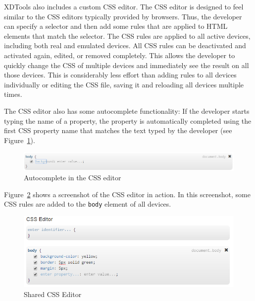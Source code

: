 XDTools also includes a custom CSS editor. The CSS editor is designed to feel similar to the CSS editors typically provided by browsers. Thus, the developer can specify a selector and then add some rules that are applied to HTML elements that match the selector. The CSS rules are applied to all active devices, including both real and emulated devices. All CSS rules can be deactivated and activated again, edited, or removed completely. This allows the developer to quickly change the CSS of multiple devices and immediately see the result on all those devices. This is considerably less effort than adding rules to all devices individually or editing the CSS file, saving it and reloading all devices multiple times.

The CSS editor also has some autocomplete functionality: If the developer starts typing the name of a property, the property is automatically completed using the first CSS property name that matches the text typed by the developer (see Figure~\ref{fig:css_autocomplete}).

\begin{figure}[H]
  \centering
    \includegraphics[width=1.0\textwidth]{images/screenshots/css_autocomplete.png}
	\caption[Screenshot: CSS editor autocomplete]{Autocomplete in the CSS editor}
	\label{fig:css_autocomplete}
\end{figure}

Figure~\ref{fig:css_editor} shows a screenshot of the CSS editor in action. In this screenshot, some CSS rules are added to the \lstinline|body| element of all devices.

\begin{figure}[H]
  \centering
    \includegraphics[width=1.0\textwidth]{images/screenshots/css_editor.png}
	\caption[Screenshot: CSS editor]{Shared CSS Editor}
	\label{fig:css_editor}
\end{figure}

